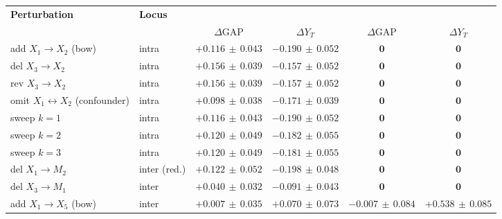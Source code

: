 \begin{tabular}{@{}ll cc cc@{}}
\toprule
\textbf{Perturbation} & \textbf{Locus} & \multicolumn{2}{c}{\textbf{\CBO{}}} & \multicolumn{2}{c}{\textbf{\QCBO{}}} \\
\cmidrule(lr){3-4}\cmidrule(lr){5-6}
 & & $\Delta$GAP & $\Delta Y_T$ & $\Delta$GAP & $\Delta Y_T$ \\
\midrule
add $X_1\!\to\!X_2$ (bow) & intra & $+0.116{\scriptstyle\,\pm\,}0.043$ & $-0.190{\scriptstyle\,\pm\,}0.052$ & $\mathbf{0}$ & $\mathbf{0}$ \\
del $X_3\!\to\!X_2$ & intra & $+0.156{\scriptstyle\,\pm\,}0.039$ & $-0.157{\scriptstyle\,\pm\,}0.052$ & $\mathbf{0}$ & $\mathbf{0}$ \\
rev $X_3\!\to\!X_2$ & intra & $+0.156{\scriptstyle\,\pm\,}0.039$ & $-0.157{\scriptstyle\,\pm\,}0.052$ & $\mathbf{0}$ & $\mathbf{0}$ \\
omit $X_1\!\leftrightarrow\!X_2$ (confounder) & intra & $+0.098{\scriptstyle\,\pm\,}0.038$ & $-0.171{\scriptstyle\,\pm\,}0.039$ & $\mathbf{0}$ & $\mathbf{0}$ \\
sweep $k{=}1$ & intra & $+0.116{\scriptstyle\,\pm\,}0.043$ & $-0.190{\scriptstyle\,\pm\,}0.052$ & $\mathbf{0}$ & $\mathbf{0}$ \\
sweep $k{=}2$ & intra & $+0.120{\scriptstyle\,\pm\,}0.049$ & $-0.182{\scriptstyle\,\pm\,}0.055$ & $\mathbf{0}$ & $\mathbf{0}$ \\
sweep $k{=}3$ & intra & $+0.120{\scriptstyle\,\pm\,}0.049$ & $-0.181{\scriptstyle\,\pm\,}0.055$ & $\mathbf{0}$ & $\mathbf{0}$ \\
del $X_1\!\to\!M_2$ & inter (red.) & $+0.122{\scriptstyle\,\pm\,}0.052$ & $-0.198{\scriptstyle\,\pm\,}0.048$ & $\mathbf{0}$ & $\mathbf{0}$ \\
del $X_3\!\to\!M_1$ & inter & $+0.040{\scriptstyle\,\pm\,}0.032$ & $-0.091{\scriptstyle\,\pm\,}0.043$ & $\mathbf{0}$ & $\mathbf{0}$ \\
add $X_1\!\to\!X_5$ (bow) & inter & $+0.007{\scriptstyle\,\pm\,}0.035$ & $+0.070{\scriptstyle\,\pm\,}0.073$ & $-0.007{\scriptstyle\,\pm\,}0.084$ & $+0.538{\scriptstyle\,\pm\,}0.085$ \\
\bottomrule
\end{tabular}
